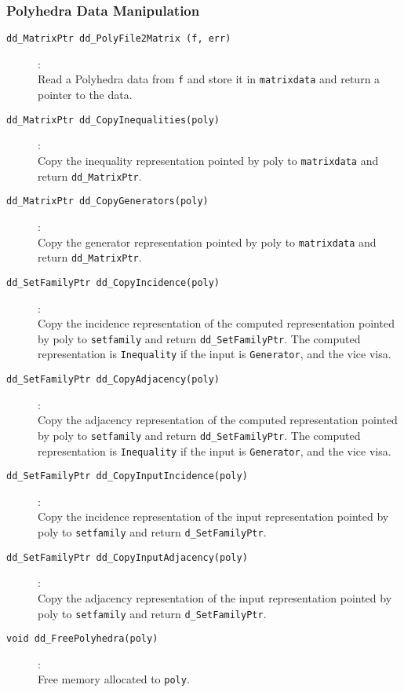 \documentclass[11pt]{article}
\newcommand {\0} {{\bf 0}}
\begin{document}
\subsubsection{Polyhedra Data Manipulation}
\begin{description}

\item[{\tt dd\_MatrixPtr dd\_PolyFile2Matrix (f, err)}]:\\
Read a Polyhedra data from {\tt f} and store it in {\tt matrixdata}
and return a pointer to the data.

\item[{\tt dd\_MatrixPtr dd\_CopyInequalities(poly)}]:\\
Copy the inequality representation pointed by poly to {\tt matrixdata}
and return {\tt dd\_MatrixPtr}.

\item[{\tt dd\_MatrixPtr dd\_CopyGenerators(poly)}]:\\ 
Copy the generator representation pointed by poly to {\tt matrixdata}
and return {\tt dd\_MatrixPtr}.

\item[{\tt dd\_SetFamilyPtr dd\_CopyIncidence(poly)}]:\\ 
Copy the incidence representation of the computed representation
pointed by poly to {\tt setfamily}
and return {\tt dd\_SetFamilyPtr}.  The computed representation is
{\tt Inequality} if the input is {\tt Generator}, and the vice visa.

\item[{\tt dd\_SetFamilyPtr dd\_CopyAdjacency(poly)}]:\\ 
Copy the adjacency representation of the computed representation
pointed by poly to {\tt setfamily}
and return {\tt dd\_SetFamilyPtr}.  The computed representation is
{\tt Inequality} if the input is {\tt Generator}, and the vice visa.

\item[{\tt dd\_SetFamilyPtr dd\_CopyInputIncidence(poly)}]:\\ 
Copy the incidence representation of the input representation
pointed by poly to {\tt setfamily}
and return {\tt d\_SetFamilyPtr}.

\item[{\tt dd\_SetFamilyPtr dd\_CopyInputAdjacency(poly)}]:\\ 
Copy the adjacency representation of the input representation
pointed by poly to {\tt setfamily}
and return {\tt d\_SetFamilyPtr}.

\item[{\tt void dd\_FreePolyhedra(poly)}]:\\
Free memory allocated to {\tt poly}.

\end{description}
\end{document}
